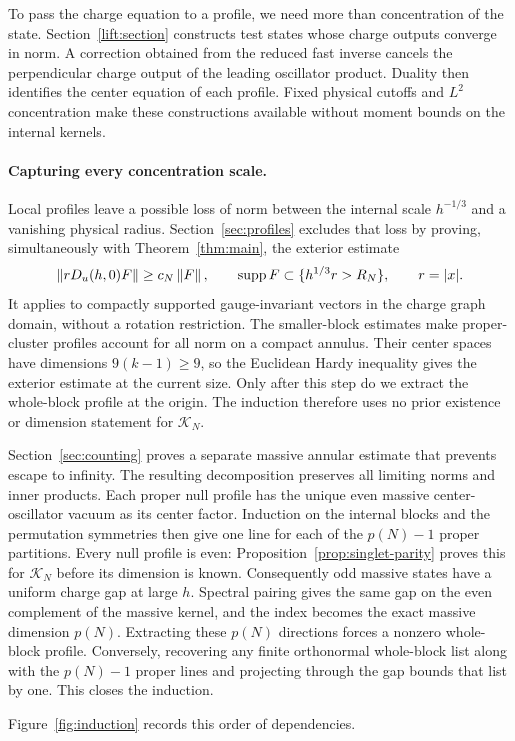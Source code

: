 To pass the charge equation to a profile, we need more than concentration
of the state. Section~\ref{lift:section} constructs test states whose
charge outputs converge in norm. A correction obtained from the reduced
fast inverse cancels the perpendicular charge output of the leading
oscillator product. Duality then identifies the center equation of each
profile. Fixed physical cutoffs and $L^2$ concentration make these
constructions available without moment bounds on the internal kernels.

\paragraph{Capturing every concentration scale.}
Local profiles leave a possible loss of norm between the internal scale
$h^{-1/3}$ and a vanishing physical radius. Section~\ref{sec:profiles}
excludes that loss by proving, simultaneously with Theorem~\ref{thm:main},
the exterior estimate
\begin{equation}
 \left\lVert rD_u(h,0)F\right\rVert\ge c_N\left\lVert F\right\rVert,
 \qquad
 \operatorname{supp} F\subset\{h^{1/3}r>R_N\},\qquad r=|x|.
 \label{eq:intro-exterior}
\end{equation}
It applies to compactly supported gauge-invariant vectors in the charge
graph domain, without a rotation restriction. The
smaller-block estimates make proper-cluster profiles account for all
norm on a compact annulus. Their center spaces have dimensions
$9(k-1)\ge9$, so the Euclidean Hardy inequality gives the exterior
estimate at the current size. Only after this step do we extract the
whole-block profile at the origin. The induction therefore uses no
prior existence or dimension statement for $\mathcal K_N$.

Section~\ref{sec:counting} proves a separate massive annular estimate
that prevents escape to infinity. The resulting decomposition preserves
all limiting norms and inner products. Each proper null profile has the
unique even massive center-oscillator vacuum as its center factor. Induction
on the internal blocks and the permutation symmetries then give one
line for each of the $p(N)-1$ proper partitions. Every null profile is even:
Proposition~\ref{prop:singlet-parity} proves this for $\mathcal K_N$
before its dimension is known. Consequently odd massive states have a
uniform charge gap at large $h$. Spectral pairing gives the same gap
on the even complement of the massive kernel, and the index becomes
the exact massive dimension $p(N)$. Extracting these $p(N)$ directions
forces a nonzero whole-block profile. Conversely, recovering any finite
orthonormal whole-block list along with the $p(N)-1$ proper lines and projecting
through the gap bounds that list by one. This closes the induction.

Figure~\ref{fig:induction} records this order of dependencies.

\clearpage
